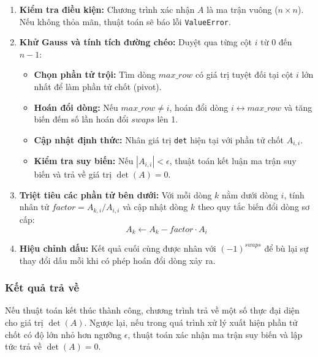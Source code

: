 \documentclass[12pt,a4paper]{article}
\begin{document}
\begin{enumerate}[label=\textbf{\alph*) Bước \arabic*:}, leftmargin=*, align=left]
\item \textbf{Kiểm tra điều kiện:} Chương trình xác nhận $A$ là ma trận vuông ($n \times n$). Nếu không thỏa mãn, thuật toán sẽ báo lỗi \texttt{ValueError}.

\item \textbf{Khử Gauss và tính tích đường chéo:}
Duyệt qua từng cột $i$ từ $0$ đến $n-1$:
\begin{itemize}[leftmargin=1.5em]
    \item \textbf{Chọn phần tử trội:} Tìm dòng $max\_row$ có giá trị tuyệt đối tại cột $i$ lớn nhất để làm phần tử chốt (pivot).
    \item \textbf{Hoán đổi dòng:} Nếu $max\_row \neq i$, hoán đổi dòng $i \leftrightarrow max\_row$ và tăng biến đếm số lần hoán đổi $swaps$ lên 1.
    \item \textbf{Cập nhật định thức:} Nhân giá trị \texttt{det} hiện tại với phần tử chốt $A_{i,i}$.
    \item \textbf{Kiểm tra suy biến:} Nếu $|A_{i,i}| < \epsilon $, thuật toán kết luận ma trận suy biến và trả về giá trị $\det(A) = 0$.
\end{itemize}

\item \textbf{Triệt tiêu các phần tử bên dưới:}
Với mỗi dòng $k$ nằm dưới dòng $i$, tính nhân tử $factor = A_{k,i} / A_{i,i}$ và cập nhật dòng $k$ theo quy tắc biến đổi dòng sơ cấp:
\begin{equation}
A_{k} \leftarrow A_{k} - factor \cdot A_{i}
\end{equation}

\item \textbf{Hiệu chỉnh dấu:}
Kết quả cuối cùng được nhân với $(-1)^{swaps}$ để bù lại sự thay đổi dấu mỗi khi có phép hoán đổi dòng xảy ra.
\end{enumerate}

\subsubsection{Kết quả trả về}
\begin{infobox}
Nếu thuật toán kết thúc thành công, chương trình trả về một số thực đại diện cho giá trị $\det(A)$. Ngược lại, nếu trong quá trình xử lý xuất hiện phần tử chốt có độ lớn nhỏ hơn ngưỡng $\epsilon$, thuật toán xác nhận ma trận suy biến và lập tức trả về $\det(A) = 0$.
\end{infobox}
\end{document}
